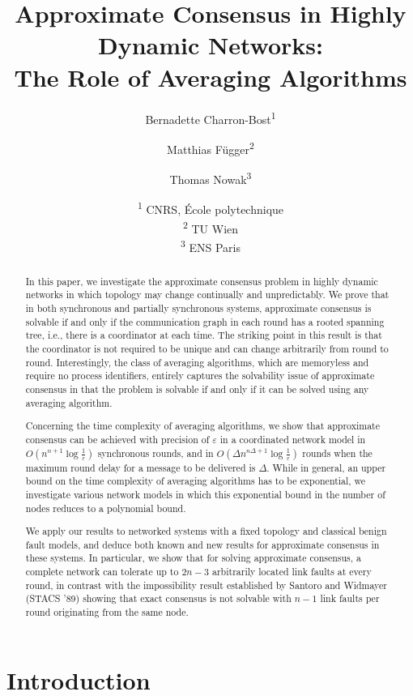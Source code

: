 \documentclass[a4paper]{article}
\title{Approximate Consensus in Highly Dynamic Networks: \\
	 The Role of Averaging Algorithms}
\author{Bernadette Charron-Bost\textsuperscript{1} \and Matthias
F\"ugger\textsuperscript{2} \and Thomas Nowak\textsuperscript{3}}
\date{\textsuperscript{1} CNRS, \'Ecole polytechnique\\
\textsuperscript{2} TU Wien\\
\textsuperscript{3} ENS Paris}
\theoremstyle{newthm}
\begin{document}
\maketitle

\begin{abstract}
In this paper, we investigate the approximate consensus problem in highly dynamic networks 
        in which topology may change continually and unpredictably.
We prove that  in both synchronous and partially synchronous systems,
        approximate consensus is solvable if and only if the
        communication graph in each round has a rooted spanning tree, i.e., there is a coordinator at each time.
The striking point in this result is that the coordinator is not required  to be unique and can
        change  arbitrarily from round to round.
Interestingly, the  class of averaging algorithms, which are memoryless
	and require no process identifiers,  entirely captures the solvability issue
        of approximate consensus in that the problem is solvable if and only if
        it can be solved using any averaging algorithm.

Concerning the time complexity of averaging algorithms, we show that approximate consensus can be 
	achieved with precision of $\varepsilon$ 
        in a coordinated network model in $O(n^{n+1} \log\frac{1}{\varepsilon})$ synchronous 
        rounds, and in $O(\Delta n^{n\Delta+1} \log\frac{1}{\varepsilon})$ rounds when the maximum 
        round delay for a message to be delivered is $\Delta$.
While in general, an upper bound on the time complexity of averaging algorithms has to be exponential,
        we investigate various network models in which this exponential bound in the number of nodes
        reduces to a polynomial  bound.

We  apply our results to networked systems with a fixed topology and classical benign  fault models,
        and deduce  both known and new results for approximate consensus in these systems.
In particular,  we show that for solving approximate consensus, a complete network can 
        tolerate up to $2n-3$ 
        arbitrarily located  link faults at every
        round, in contrast with the impossibility result 
         established by Santoro and Widmayer (STACS '89) showing that 
         exact consensus is not solvable with $n-1$ link faults per round originating from the same node.
\end{abstract}

\setcounter{footnote}{3}

\section{Introduction}
\end{document}
